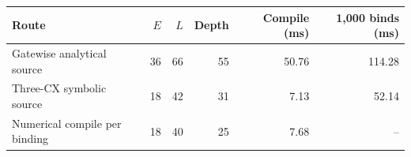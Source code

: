 \begin{center}\small\begin{tabular}{lrrrrr}\toprule
Route & $E$ & $L$ & Depth & Compile (ms) & 1,000 binds (ms)\\\midrule
Gatewise analytical source & 36 & 66 & 55 & 50.76 & 114.28\\
Three-CX symbolic source & 18 & 42 & 31 & 7.13 & 52.14\\
Numerical compile per binding & 18 & 40 & 25 & 7.68 & --\\
\bottomrule\end{tabular}\end{center}
